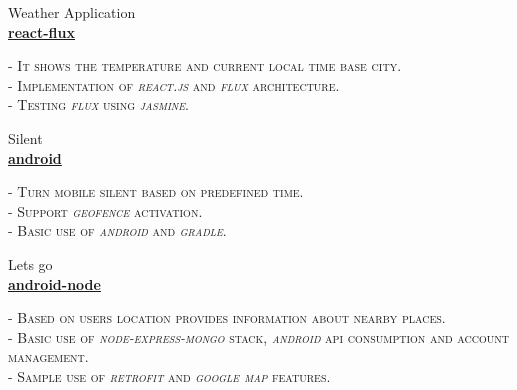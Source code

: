 \documentclass[10pt]{article} %
\begin{document}
{\begin{minipage}[t]{0.5\textwidth}


{\raggedright\large Weather Application \\
	\large\textbf{\href {https://github.com/Bitaron/js/tree/weather}{react-flux}}\\[5pt]}
\textsc{- It shows the temperature and current local time base city.}\\
\textsc{- Implementation of  \textit{react.js} and  \textit{flux} architecture.}\\
\textsc{- Testing  \textit{flux} using \textit{jasmine}.}\\




{\raggedright\large Silent \\
	\large\textbf{\href {https://dl.dropboxusercontent.com/u/84146203/projects/android/silent.apk}{android}}\\[5pt]}
\textsc{- Turn mobile silent based on predefined time.}\\
\textsc{- Support \textit{geofence} activation.}\\
\textsc{- Basic use of \textit{android} and \textit{gradle}.}\\




{\raggedright\large Lets go \\
	\large\textbf{\href {https://dl.dropboxusercontent.com/u/84146203/projects/android/letsgo.apk}{android-node}}\\[5pt]}
\textsc{- Based on users location provides information about nearby places.}\\
\textsc{- Basic use of \textit{node-express-mongo} stack, \textit{android} api consumption and account management.}\\
\textsc{- Sample use of \textit{retrofit} and \textit{google map} features.}\\



\end{minipage} %
\hfill
\begin{minipage}[t]{0.44\textwidth} %
\vspace{0pt} %


\end{minipage}}
\end{document}
